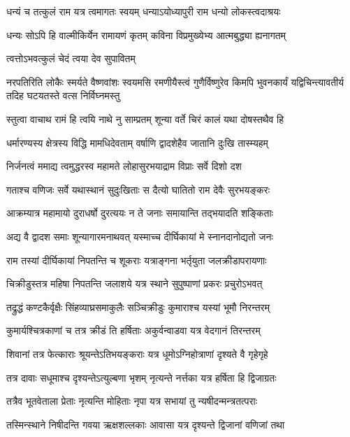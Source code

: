 \twolineshloka
{धन्यं च तत्कुलं राम यत्र त्वमागतः स्वयम्}
{धन्याऽयोध्यापुरी राम धन्यो लोकस्त्वदाश्रयः}%

\twolineshloka
{धन्यः सोऽपि हि वाल्मीकिर्येन रामायणं कृतम्}
{कविना विप्रमुख्येभ्य आत्मबुद्ध्या ह्यनागतम्}%

\onelineshloka
{त्वत्तोऽभवत्कुलं चेदं त्वया देव सुपावितम्}%

\twolineshloka
{नरपतिरिति लोकैः स्मर्यते वैष्णवांशः स्वयमसि रमणीयैस्त्वं गुणैर्विष्णुरेव}
{किमपि भुवनकार्यं यद्विचिन्त्यावतीर्य तदिह घटयतस्ते वत्स निर्विघ्नमस्तु}%

\twolineshloka
{स्तुत्वा वाचाथ रामं हि त्वयि नाथे नु साम्प्रतम्}
{शून्या वर्ते चिरं कालं यथा दोषस्तथैव हि}%

\twolineshloka
{धर्मारण्यस्य क्षेत्रस्य विद्धि मामधिदेवताम्}
{वर्षाणि द्वादशेहैव जातानि दुःखि तास्म्यहम्}%

\twolineshloka
{निर्जनत्वं ममाद्य त्वमुद्धरस्व महामते}
{लोहासुरभयाद्राम विप्राः सर्वे दिशो दश}%

\twolineshloka
{गताश्च वणिजः सर्वे यथास्थानं सुदुःखिताः}
{स दैत्यो घातितो राम देवैः सुरभयङ्करः}%

\twolineshloka
{आक्रम्यात्र महामायो दुराधर्षो दुरत्ययः}
{न ते जनाः समायान्ति तद्भयादति शङ्किताः}%

\twolineshloka
{अद्य वै द्वादश समाः शून्यागारमनाथवत्}
{यस्माच्च दीर्घिकायां मे स्नानदानोद्यतो जनः}%

\twolineshloka
{राम तस्यां दीर्घिकायां निपतन्ति च शूकराः}
{यत्राङ्गना भर्तृयुता जलक्रीडापरायणाः}%

\twolineshloka
{चिक्रीडुस्तत्र महिषा निपतन्ति जलाशये}
{यत्र स्थाने सुपुष्पाणां प्रकरः प्रचुरोऽभवत्}%

\twolineshloka
{तद्रुद्धं कण्टकैर्वृक्षैः सिंहव्याघ्रसमाकुलैः}
{सञ्चिक्रीडुः कुमाराश्च यस्यां भूमौ निरन्तरम्}%

\twolineshloka
{कुमार्यश्चित्रकाणां च तत्र क्रीडं ति हर्षिताः}
{अकुर्वन्वाडवा यत्र वेदगानं तिरन्तरम्}%

\twolineshloka
{शिवानां तत्र फेत्काराः श्रूयन्तेऽतिभयङ्कराः}
{यत्र धूमोऽग्निहोत्राणां दृश्यते वै गृहेगृहे}%

\twolineshloka
{तत्र दावाः सधूमाश्च दृश्यन्तेऽत्युल्बणा भृशम्}
{नृत्यन्ते नर्त्तका यत्र हर्षिता हि द्विजाग्रतः}%

\twolineshloka
{तत्रैव भूतवेताला प्रेताः नृत्यन्ति मोहिताः}
{नृपा यत्र सभायां तु न्यषीदन्मन्त्रतत्पराः}%

\twolineshloka
{तस्मिन्स्थाने निषीदन्ति गवया ऋक्षशल्लकाः}
{आवासा यत्र दृश्यन्ते द्विजानां वणिजां तथा}%

